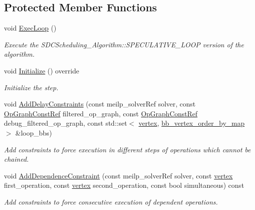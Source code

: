 \subsection*{Protected Member Functions}
\begin{DoxyCompactItemize}
\item 
void \hyperlink{classSDCScheduling_ae7d1f9a68a81ac64d667bc7e03b93679}{Exec\+Loop} ()
\begin{DoxyCompactList}\small\item\em Execute the S\+D\+C\+Scheduling\+\_\+\+Algorithm\+::\+S\+P\+E\+C\+U\+L\+A\+T\+I\+V\+E\+\_\+\+L\+O\+OP version of the algorithm. \end{DoxyCompactList}\item 
void \hyperlink{classSDCScheduling_a6776ee26349c16c789a5b2c33c1fa9ff}{Initialize} () override
\begin{DoxyCompactList}\small\item\em Initialize the step. \end{DoxyCompactList}\item 
void \hyperlink{classSDCScheduling_afbe0541a2c1778638bbe1c1251771b8d}{Add\+Delay\+Constraints} (const meilp\+\_\+solver\+Ref solver, const \hyperlink{op__graph_8hpp_a9a0b240622c47584bee6951a6f5de746}{Op\+Graph\+Const\+Ref} filtered\+\_\+op\+\_\+graph, const \hyperlink{op__graph_8hpp_a9a0b240622c47584bee6951a6f5de746}{Op\+Graph\+Const\+Ref} debug\+\_\+filtered\+\_\+op\+\_\+graph, const std\+::set$<$ \hyperlink{graph_8hpp_abefdcf0544e601805af44eca032cca14}{vertex}, \hyperlink{classbb__vertex__order__by__map}{bb\+\_\+vertex\+\_\+order\+\_\+by\+\_\+map} $>$ \&loop\+\_\+bbs)
\begin{DoxyCompactList}\small\item\em Add constraints to force execution in different steps of operations which cannot be chained. \end{DoxyCompactList}\item 
void \hyperlink{classSDCScheduling_a1ba2f8b6af879bd8e641a0604ecaf70c}{Add\+Dependence\+Constraint} (const meilp\+\_\+solver\+Ref solver, const \hyperlink{graph_8hpp_abefdcf0544e601805af44eca032cca14}{vertex} first\+\_\+operation, const \hyperlink{graph_8hpp_abefdcf0544e601805af44eca032cca14}{vertex} second\+\_\+operation, const bool simultaneous) const
\begin{DoxyCompactList}\small\item\em Add constraints to force consecutive execution of dependent operations. \end{DoxyCompactList}\item 

\end{DoxyCompactItemize}
